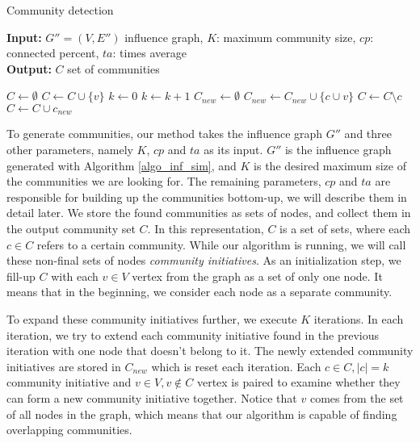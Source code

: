 \documentclass[pdflatex,sn-mathphys-ay]{sn-jnl}
\begin{document}
\begin{algorithm}[ht]
\caption{Community detection}
\label{algo_comm_det}
\textbf{Input:} $G'' = (V,E'')$ influence graph, $K$: maximum community size, $cp$: connected percent, $ta$: times average
\\
\textbf{Output:} $C$ set of communities
\begin{algorithmic}[1]
    \State $C \gets \emptyset$
        \State $C \gets C \cup \{v\}$
    \EndFor
    \State $k \gets 0$
        \State $k \gets k + 1$
        \State $C_{new} \gets \emptyset$
                \State $C_{new} \gets C_{new} \cup \{c \cup v\}$
            \EndIf
        \EndFor
                \State $C \gets C \setminus c$
            \EndIf
        \EndFor
            \State $C \gets C \cup c_{new}$
        \EndFor
    \EndWhile
\end{algorithmic}
\end{algorithm}

To generate communities, our method takes the influence graph $G''$ and three other parameters, namely $K$, $cp$ and $ta$ as its input. $G''$ is the influence graph generated with Algorithm \ref{algo_inf_sim}, and $K$ is the desired maximum size of the communities we are looking for. The remaining parameters, $cp$ and $ta$ are responsible for building up the communities bottom-up, we will describe them in detail later.
We store the found communities as sets of nodes, and collect them in the output community set $C$. In this representation, $C$ is a set of sets, where each $c \in C$ refers to a certain community. While our algorithm is running, we will call these non-final sets of nodes \textit{community initiatives}. As an initialization step, we fill-up $C$ with each $v \in V$ vertex from the graph as a set of only one node. It means that in the beginning, we consider each node as a separate community.

To expand these community initiatives further, we execute $K$ iterations. In each iteration, we try to extend each community initiative found in the previous iteration with one node that doesn't belong to it. The newly extended community initiatives are stored in $C_{new}$ which is reset each iteration. Each $c \in C, |c|=k$ community initiative and $v \in V, v \notin C$ vertex is paired to examine whether they can form a new community initiative together. Notice that $v$ comes from the set of all nodes in the graph, which means that our algorithm is capable of finding overlapping communities.
\end{document}
